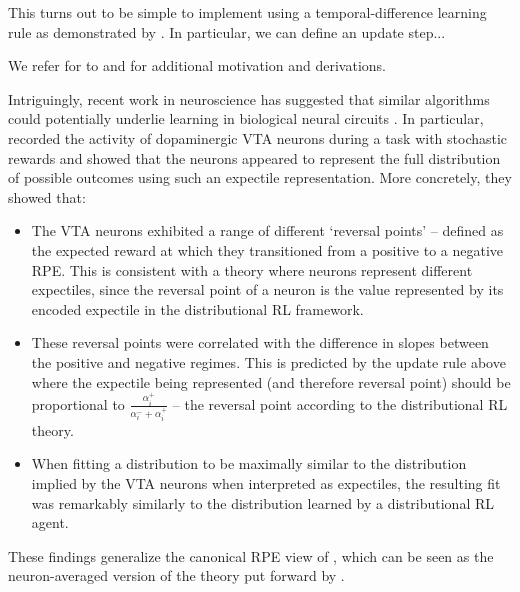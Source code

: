 This turns out to be simple to implement using a temporal-difference learning rule as demonstrated by \citep{dabney2018distributional}.
In particular, we can define an update step...

We refer for to \citet{dabney2018distributional} and \citet{bellemare2023distributional} for additional motivation and derivations.


Intriguingly, recent work in neuroscience has suggested that similar algorithms could potentially underlie learning in biological neural circuits \citep{dabney2020distributional,lowet2020distributional}.
In particular, \citet{dabney2020distributional} recorded the activity of dopaminergic VTA neurons during a task with stochastic rewards and showed that the neurons appeared to represent the full distribution of possible outcomes using such an expectile representation.
More concretely, they showed that:
\begin{itemize}
    \item The VTA neurons exhibited a range of different `reversal points' -- defined as the expected reward at which they transitioned from a positive to a negative RPE.
    This is consistent with a theory where neurons represent different expectiles, since the reversal point of a neuron is the value represented by its encoded expectile in the distributional RL framework.
    \item These reversal points were correlated with the difference in slopes between the positive and negative regimes.
    This is predicted by the update rule above where the expectile being represented (and therefore reversal point) should be proportional to $\frac{\alpha_i^{+}}{\alpha_i^- + \alpha_i^+}$ -- the reversal point according to the distributional RL theory.
    \item When fitting a distribution to be maximally similar to the distribution implied by the VTA neurons when interpreted as expectiles, the resulting fit was remarkably similarly to the distribution learned by a distributional RL agent.
\end{itemize}
These findings generalize the canonical RPE view of \citet{schultz1997neural}, which can be seen as the neuron-averaged version of the theory put forward by \citet{dabney2020distributional}.

